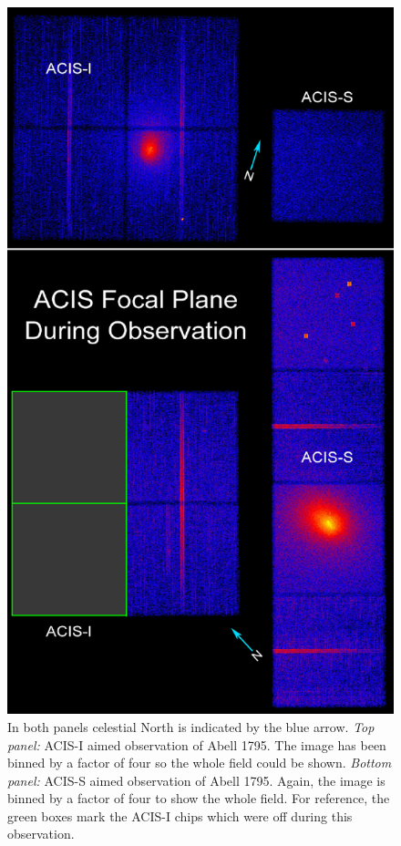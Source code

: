 \begin{figure}[!hp]
  \begin{center}
    \includegraphics*[height=0.8\textheight, trim=0mm 0mm 0mm 0mm, clip]{obs}
    \caption[ACIS focal plane during observation.]{ In both panels
      celestial North is indicated by the blue arrow. {\it{Top
          panel:}} ACIS-I aimed observation of Abell 1795. The image
      has been binned by a factor of four so the whole field could be
      shown. {\it{Bottom panel:}} ACIS-S aimed observation of Abell
      1795. Again, the image is binned by a factor of four to show the
      whole field. For reference, the green boxes mark the ACIS-I
      chips which were off during this observation.}
    \label{fig:obs}
  \end{center}
\end{figure}


